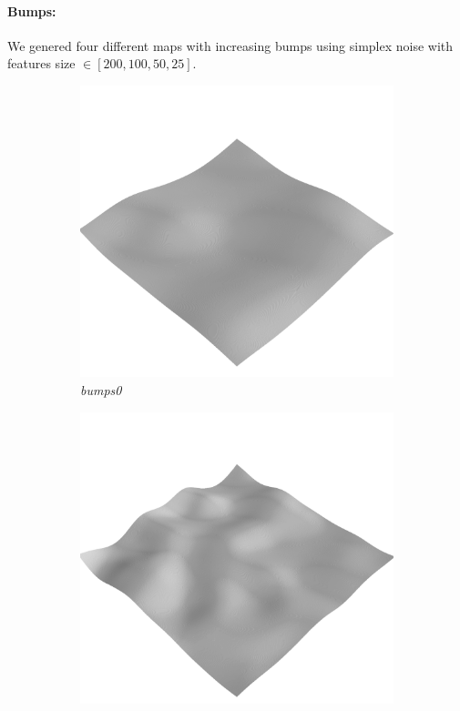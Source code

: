 \documentclass[../document.tex]{subfiles}
\begin{document}
\paragraph{Bumps:}
We genered four different maps with increasing bumps using simplex noise with features size $\in[200,100,50,25 ]$. 
\begin{figure}[H]
    \centering
        \begin{subfigure}[b]{0.32\textwidth}
            \includegraphics[width=\textwidth]{../img/hm3d/bumps0.png}
            \caption{\emph{bumps0}}
        \end{subfigure}
        \begin{subfigure}[b]{0.32\linewidth}
            \includegraphics[width=\textwidth]{../img/hm3d/bumps1.png}

\end{subfigure}
\end{figure}
\end{document}
